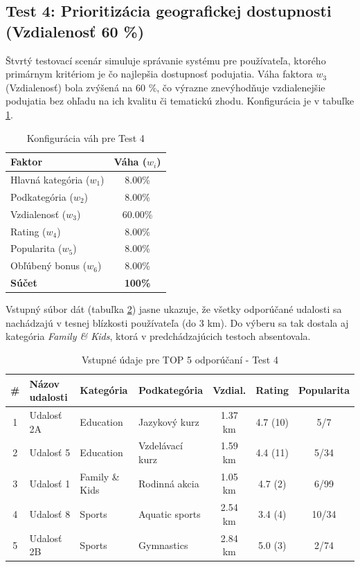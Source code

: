 \documentclass[12pt,a4paper]{article}
\begin{document}
\subsection{Test 4: Prioritizácia geografickej dostupnosti (Vzdialenosť 60 \%)}

Štvrtý testovací scenár simuluje správanie systému pre používateľa, ktorého primárnym kritériom je čo najlepšia dostupnosť podujatia. Váha faktora $w_3$ (Vzdialenosť) bola zvýšená na 60 \%, čo výrazne znevýhodňuje vzdialenejšie podujatia bez ohľadu na ich kvalitu či tematickú zhodu. Konfigurácia je v tabuľke \ref{tab:vahy_test4}.

\begin{table}[H]
\centering
\begin{tabular}{|l|c|}
\hline
\textbf{Faktor} & \textbf{Váha ($w_i$)} \\
\hline
Hlavná kategória ($w_1$) & 8.00\% \\
Podkategória ($w_2$) & 8.00\% \\
Vzdialenosť ($w_3$) & 60.00\% \\
Rating ($w_4$) & 8.00\% \\
Popularita ($w_5$) & 8.00\% \\
Obľúbený bonus ($w_6$) & 8.00\% \\
\hline
\textbf{Súčet} & \textbf{100\%} \\
\hline
\end{tabular}
\caption{Konfigurácia váh pre Test 4}
\label{tab:vahy_test4}
\end{table}

Vstupný súbor dát (tabuľka \ref{tab:data_test4}) jasne ukazuje, že všetky odporúčané udalosti sa nachádzajú v tesnej blízkosti používateľa (do 3 km). Do výberu sa tak dostala aj kategória \textit{Family \& Kids}, ktorá v predchádzajúcich testoch absentovala.

\begin{table}[H]
\centering
\small
\begin{tabular}{|c|l|l|l|c|c|c|}
\hline
\textbf{\#} & \textbf{Názov udalosti} & \textbf{Kategória} & \textbf{Podkategória} & \textbf{Vzdial.} & \textbf{Rating} & \textbf{Popularita} \\
\hline
1 & Udalosť 2A & Education      & Jazykový kurz   & 1.37 km & 4.7 (10) & 5/7 \\
2 & Udalosť 5  & Education      & Vzdelávací kurz & 1.59 km & 4.4 (11) & 5/34 \\
3 & Udalosť 1  & Family \& Kids & Rodinná akcia   & 1.05 km & 4.7 (2)  & 6/99 \\
4 & Udalosť 8  & Sports         & Aquatic sports  & 2.54 km & 3.4 (4)  & 10/34 \\
5 & Udalosť 2B & Sports         & Gymnastics      & 2.84 km & 5.0 (3)  & 2/74 \\
\hline
\end{tabular}
\caption{Vstupné údaje pre TOP 5 odporúčaní - Test 4}
\label{tab:data_test4}
\end{table}
\end{document}
